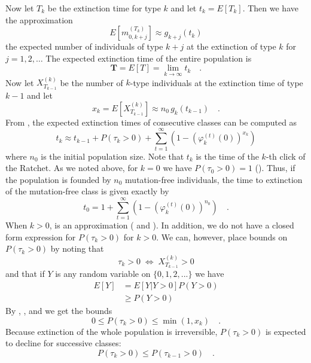 \documentclass[9pt,lineno]{elife}
\begin{document}
Now let $T_{k}$ be the extinction time for type $k$ and let $t_{k}=E[T_{k}]$. Then we have the approximation
%
\begin{equation}
E\left[m_{0,k+j}^{(T_{k})}\right]\approx g_{k+j}(t_{k})
\label{eq:approx}
\end{equation}
%
the expected number of individuals of type $k+j$ at the extinction of type $k$ for $j=1,2,\ldots$ The expected extinction time of the entire population is
%
\begin{equation}
%
\mathbf{T} = E[T] = \lim_{k\rightarrow\infty}t_{k} \quad .
%
\label{eq:T}
\end{equation}
%
Now let $X_{T_{k-1}}^{(k)}$ 
be the number of $k$-type individuals at the extinction time of type $k-1$ and let 
%
\begin{equation}
%
x_{k} = E\left[X_{T_{k-1}}^{(k)}\right] \approx n_{0} \, g_{k}(t_{k-1}) \quad .
%
\label{eq:xk}
\end{equation}
%
From , the expected extinction times of consecutive classes can be computed as 
%
\begin{equation}
%
t_{k}\approx t_{k-1}+P(\tau_{k}>0)+\sum_{t=1}^{\infty}\left(1-\left(\varphi_{k}^{(t)}(0)\right)^{x_{k}}\right)
%
\label{eq:tk}
\end{equation}
%
where $n_0$ is the initial population size.  
Note that $t_k$ is the time of the $k$-th click of the Ratchet.
As we noted above, for $k=0$ we have $P(\tau_{0}>0)=1$ 
().  Thus, if the population is founded by $n_0$ mutation-free individuals, the time to extinction of the mutation-free class is given exactly by
%
\begin{equation}
t_{0} = 1+\sum_{t=1}^{\infty}\left(1-\left(\varphi_{k}^{(t)}(0)\right)^{n_{0}}\right) \quad .
\label{eq:t0}
\end{equation}
%
When $k>0$,  is an approximation ( and ).
In addition, we do not have a closed form expression for $P(\tau_{k}>0)$ for $k>0$.
We can, however, place bounds on $P(\tau_{k}>0)$ by noting that
%
\begin{equation}
\tau_{k} > 0 \; \Leftrightarrow \; X_{T_{k-1}}^{(k)} > 0
\label{eq:tauk2}
\end{equation}
%
and that if $Y$ is any random variable on $\{0, 1, 2, ...\}$ we have
%
\begin{align}
%
E[Y]  & =   E\left[Y|Y>0\right] P(Y>0)\nonumber\\
      & \geq  P(Y>0)
%
\label{eq:exp}
\end{align}
%
By , , and  we get the bounds 
%
\begin{equation}
%
0 \leq P(\tau_{k} > 0) \leq \min(1,x_{k}) \quad .
\label{eq:bounds}
%
\end{equation}
Because extinction of the whole population is irreversible, $P(\tau_{k} > 0)$ is expected to decline for successive classes:
\begin{equation*}
P(\tau_k>0) \leq P(\tau_{k-1}>0) \quad .
\end{equation*}
\end{document}
